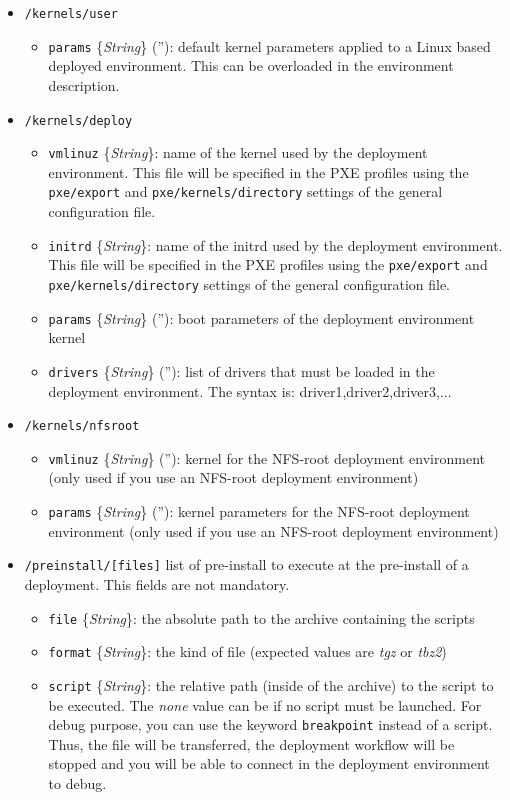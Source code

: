 \documentclass[a4wide,10pt,oneside]{book}
\newcommand{\ypath}[1]{\texttt{#1}}
\newcommand{\yfield}[2]{\texttt{#1} {\small\{{\emph{#2}}\}}:}
\newcommand{\yfieldd}[3]{\texttt{#1} {\small\{{\emph{#2}}\}} {\small(}#3{\small)}:}
\begin{document}
\begin{itemize}
  \item \ypath{/kernels/user}
  \begin{itemize}
    \item \yfieldd{params}{String}{''} default kernel parameters applied to a Linux based deployed environment. This can be overloaded in the environment description.
  \end{itemize}

  \item \ypath{/kernels/deploy}
  \begin{itemize}
    \item \yfield{vmlinuz}{String} name of the kernel used by the deployment environment. This file will be specified in the PXE profiles using the \ypath{pxe/export} and \ypath{pxe/kernels/directory} settings of the general configuration file.
    \item \yfield{initrd}{String} name of the initrd used by the deployment environment. This file will be specified in the PXE profiles using the \ypath{pxe/export} and \ypath{pxe/kernels/directory} settings of the general configuration file.
    \item \yfieldd{params}{String}{''} boot parameters of the deployment environment kernel
    \item \yfieldd{drivers}{String}{''} list of drivers that must be loaded in the deployment environment. The syntax is: driver1,driver2,driver3,...
  \end{itemize}

  \item \ypath{/kernels/nfsroot}
  \begin{itemize}
    \item \yfieldd{vmlinuz}{String}{''} kernel for the NFS-root deployment environment (only used if you use an NFS-root deployment environment)
    \item \yfieldd{params}{String}{''} kernel parameters for the NFS-root deployment environment (only used if you use an NFS-root deployment environment)
  \end{itemize}

  \item \ypath{/preinstall/[files]} list of pre-install to execute at the pre-install of a deployment. This fields are not mandatory. 
  \begin{itemize}
    \item \yfield{file}{String} the absolute path to the archive containing the scripts
    \item \yfield{format}{String} the kind of file (expected values are \emph{tgz} or \emph{tbz2})
    \item \yfield{script}{String} the relative path (inside of the archive) to the script to be executed. The \textit{none} value can be if no script must be launched. For debug purpose, you can use the keyword \texttt{breakpoint} instead of a script. Thus, the file will be transferred, the deployment workflow will be stopped and you will be able to connect in the deployment environment to debug. 
  \end{itemize}


\end{itemize}
\end{document}
